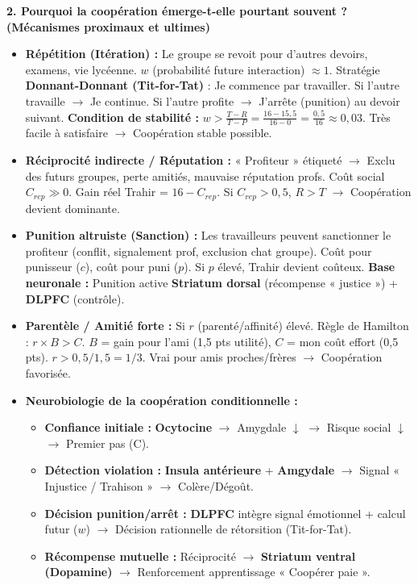 \documentclass[11pt]{article}
\begin{document}
\begin{exoresolu}
\textbf{2. Pourquoi la coopération émerge-t-elle pourtant souvent ? (Mécanismes proximaux et ultimes)}

\begin{itemize}
    \item \textbf{Répétition (Itération) :} Le groupe se revoit pour d'autres devoirs, examens, vie lycéenne. $w$ (probabilité future interaction) $\approx 1$. Stratégie \textbf{Donnant-Donnant (Tit-for-Tat)} : Je commence par travailler. Si l'autre travaille $\to$ Je continue. Si l'autre profite $\to$ J'arrête (punition) au devoir suivant. \textbf{Condition de stabilité :} $w > \frac{T-R}{T-P} = \frac{16-15,5}{16-0} = \frac{0,5}{16} \approx 0,03$. Très facile à satisfaire $\to$ Coopération stable possible.
    \item \textbf{Réciprocité indirecte / Réputation :} « Profiteur » étiqueté $\to$ Exclu des futurs groupes, perte amitiés, mauvaise réputation profs. Coût social $C_{rep} \gg 0$. Gain réel Trahir = $16 - C_{rep}$. Si $C_{rep} > 0,5$, $R > T$ $\to$ Coopération devient dominante.
    \item \textbf{Punition altruiste (Sanction) :} Les travailleurs peuvent sanctionner le profiteur (conflit, signalement prof, exclusion chat groupe). Coût pour punisseur ($c$), coût pour puni ($p$). Si $p$ élevé, Trahir devient coûteux. \textbf{Base neuronale :} Punition active \textbf{Striatum dorsal} (récompense « justice ») + \textbf{DLPFC} (contrôle).
    \item \textbf{Parentèle / Amitié forte :} Si $r$ (parenté/affinité) élevé. Règle de Hamilton : $r \times B > C$. $B$ = gain pour l'ami (1,5 pts utilité), $C$ = mon coût effort (0,5 pts). $r > 0,5/1,5 = 1/3$. Vrai pour amis proches/frères $\to$ Coopération favorisée.
    \item \textbf{Neurobiologie de la coopération conditionnelle :}
    \begin{itemize}
        \item \textbf{Confiance initiale :} \textbf{Ocytocine} $\to$ Amygdale $\downarrow$ $\to$ Risque social $\downarrow$ $\to$ Premier pas (C).
        \item \textbf{Détection violation :} \textbf{Insula antérieure} + \textbf{Amgydale} $\to$ Signal « Injustice / Trahison » $\to$ Colère/Dégoût.
        \item \textbf{Décision punition/arrêt :} \textbf{DLPFC} intègre signal émotionnel + calcul futur ($w$) $\to$ Décision rationnelle de rétorsition (Tit-for-Tat).
        \item \textbf{Récompense mutuelle :} Réciprocité $\to$ \textbf{Striatum ventral (Dopamine)} $\to$ Renforcement apprentissage « Coopérer paie ».
    \end{itemize}
\end{itemize}


\end{exoresolu}
\end{document}
